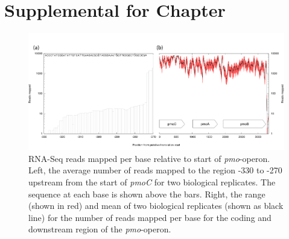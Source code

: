 \chapter{Supplemental for Chapter }

\begin{figure}[H]
\centering
     \includegraphics[width=1.0\textwidth]{./tex/chapter1/figures/supplemental/FigureS1.png}
     \begin{singlespace}
     \caption[RNA-Seq reads mapped per base relative to start of \textit{pmo}-operon]{
        RNA-Seq reads mapped per base relative to start of \textit{pmo}-operon.
        Left, the average number of reads mapped to the region -330 to -270 upstream from the start of \textit{pmoC} for two biological replicates.
        The sequence at each base is shown above the bars.
        Right, the range (shown in red) and mean of two biological replicates (shown as black line) for the number of reads mapped per base for the coding and downstream region of the \textit{pmo}-operon.}
     \label{fig:S1} %
     \end{singlespace}
\end{figure}

